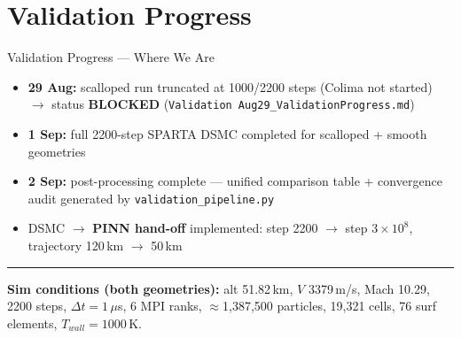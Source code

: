 \documentclass[aspectratio=169,10pt]{beamer}
\begin{document}
\section{Validation Progress}

\begin{frame}{Validation Progress --- Where We Are}
  \begin{itemize}
    \item \textbf{29 Aug:} scalloped run truncated at 1000/2200 steps
          (Colima not started) $\rightarrow$ status \textbf{BLOCKED}
          (\texttt{Validation Aug29\_ValidationProgress.md})
    \item \textbf{1 Sep:} full 2200-step SPARTA DSMC completed for
          scalloped + smooth geometries
    \item \textbf{2 Sep:} post-processing complete --- unified
          comparison table + convergence audit generated by
          \texttt{validation\_pipeline.py}
    \item DSMC $\rightarrow$ \textbf{PINN hand-off} implemented:
          step 2200 $\rightarrow$ step $3\times 10^{8}$,
          trajectory 120\,km $\rightarrow$ 50\,km
  \end{itemize}
  \vspace{4pt}
  \hrule
  \vspace{4pt}
  \textbf{Sim conditions (both geometries):} alt 51.82\,km, $V$ 3379\,m/s,
  Mach 10.29, 2200 steps, $\Delta t = 1\,\mu$s, 6 MPI ranks,
  $\approx$1{,}387{,}500 particles, 19{,}321 cells, 76 surf elements,
  $T_{wall}=1000$\,K.
\end{frame}
\end{document}
